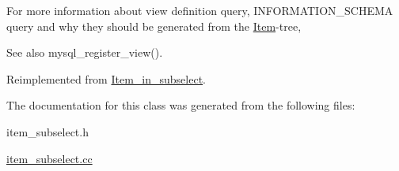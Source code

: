 For more information about view definition query, I\+N\+F\+O\+R\+M\+A\+T\+I\+O\+N\+\_\+\+S\+C\+H\+E\+MA query and why they should be generated from the \mbox{\hyperlink{classItem}{Item}}-\/tree, \begin{DoxySeeAlso}{See also}
mysql\+\_\+register\+\_\+view(). 
\end{DoxySeeAlso}


Reimplemented from \mbox{\hyperlink{classItem__in__subselect_a8c80eb807d1c1219807fd45db61fad8f}{Item\+\_\+in\+\_\+subselect}}.



The documentation for this class was generated from the following files\+:\begin{DoxyCompactItemize}
\item 
item\+\_\+subselect.\+h\item 
\mbox{\hyperlink{item__subselect_8cc}{item\+\_\+subselect.\+cc}}\end{DoxyCompactItemize}
